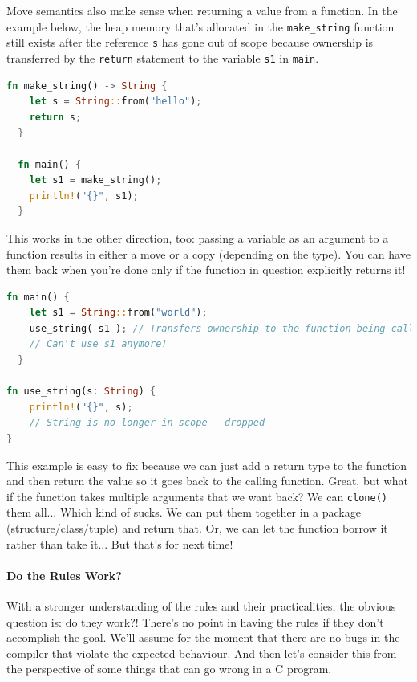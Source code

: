 \documentclass[a4paper]{report}
\begin{document}
Move semantics also make sense when returning a value from a function. In the example below, the heap memory that's allocated in the \texttt{make\_string} function still exists after the reference \texttt{s} has gone out of scope because ownership is transferred by the \texttt{return} statement to the variable \texttt{s1} in \texttt{main}.

\begin{lstlisting}[language=Rust]
  fn make_string() -> String {
    let s = String::from("hello");
    return s;
  }

  fn main() {
    let s1 = make_string();
    println!("{}", s1);
  }
\end{lstlisting}

This works in the other direction, too: passing a variable as an argument to a function results in either a move or a copy (depending on the type). You can have them back when you're done only if the function in question explicitly returns it! 

\begin{lstlisting}[language=Rust]
  fn main() {
    let s1 = String::from("world");
	use_string( s1 ); // Transfers ownership to the function being called
	// Can't use s1 anymore!
  }
  
fn use_string(s: String) {
    println!("{}", s); 
    // String is no longer in scope - dropped
}
\end{lstlisting}

This example is easy to fix because we can just add a return type to the function and then return the value so it goes back to the calling function. Great, but what if the function takes multiple arguments that we want back? We can \texttt{clone()} them all... Which kind of sucks. We can put them together in a package (structure/class/tuple) and return that. Or, we can let the function borrow it rather than take it... But that's for next time!

\paragraph{Do the Rules Work?}
With a stronger understanding of the rules and their practicalities, the obvious question is: do they work?! There's no point in having the rules if they don't accomplish the goal. We'll assume for the moment that there are no bugs in the compiler that violate the expected behaviour. And then let's consider this from the perspective of some things that can go wrong in a C program.
\end{document}
